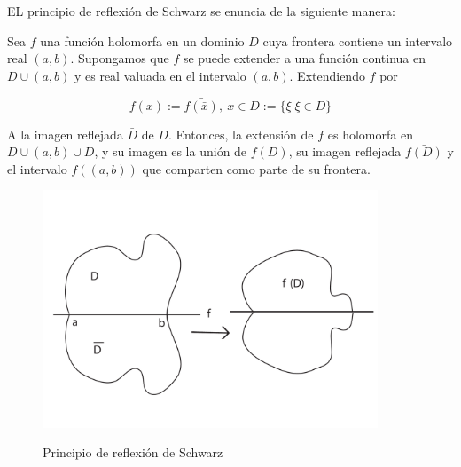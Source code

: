 EL principio de reflexi\'on de Schwarz se enuncia de la siguiente manera:

\begin{prop}
Sea $f$ una funci\'on holomorfa en un dominio $D$ cuya frontera contiene un intervalo real $(a,b)$. Supongamos que $f$ se puede extender a una funci\'on continua en $D \cup (a,b)$ y es real valuada en el intervalo $(a,b)$. Extendiendo $f$ por

$$f(x):= \bar{f(\bar{x})}, \ x\in \bar{D}:= \lbrace \bar{\xi} | \xi \in D \rbrace $$

A la imagen reflejada $\bar{D}$ de $D$. Entonces, la extensi\'on de $f$ es holomorfa en $D \cup (a,b) \cup \bar{D}$, y su imagen es la uni\'on de $f(D)$, su imagen reflejada $\bar{f(D)}$ y el intervalo $f((a,b))$ que comparten como parte de su frontera. 
\end{prop}

\begin{figure}[h]
  \centering
  \includegraphics[width=10cm]{apendice3}\\
  \caption{Principio de reflexi\'on de Schwarz}\label{apendice3}
\end{figure}



\ifpdf
    \graphicspath{{5_conclusion/figures/PNG/}{5_conclusion/figures/PDF/}{5_conclusion/figures/}}
\else
    \graphicspath{{5_conclusion/figures/EPS/}{5_conclusion/figures/}}
\fi






